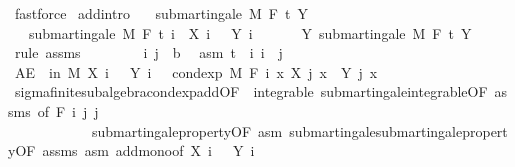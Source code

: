 \begin{isabellebody}
\ fastforce%
\endisatagproof
{\isafoldproof}%
%
\isadelimproof
\isanewline
%
\endisadelimproof
\isanewline
{}\isamarkupfalse%
\ add{\isacharbrackleft}{\kern0pt}intro{\isacharbrackright}{\kern0pt}{\isacharcolon}{\kern0pt}\isanewline
\ \ \ {\isachardoublequoteopen}submartingale\ M\ F\ t\ Y{\isachardoublequoteclose}\isanewline
\ \ \ {\isachardoublequoteopen}submartingale\ M\ F\ t\ {\isacharparenleft}{\kern0pt}{\isasymlambda}i\ {\isasymxi}{\isachardot}{\kern0pt}\ X\ i\ {\isasymxi}\ {\isacharplus}{\kern0pt}\ Y\ i\ {\isasymxi}{\isacharparenright}{\kern0pt}{\isachardoublequoteclose}\isanewline
%
\isadelimproof
%
\endisadelimproof
%
\isatagproof
{}\isamarkupfalse%
\ {\isacharminus}{\kern0pt}\isanewline
\ \ \isamarkupfalse%
\ Y{\isacharcolon}{\kern0pt}\ submartingale\ M\ F\ t\ Y\ \isamarkupfalse%
\ {\isacharparenleft}{\kern0pt}rule\ assms{\isacharparenright}{\kern0pt}\isanewline
\ \ \isacommand{{\isacharbraceleft}{\kern0pt}}\isamarkupfalse%
\isanewline
\ \ \ \ \isamarkupfalse%
\ i\ j\ {\isacharcolon}{\kern0pt}{\isacharcolon}{\kern0pt}\ {\isacharprime}{\kern0pt}b\ \isamarkupfalse%
\ asm{\isacharcolon}{\kern0pt}\ {\isachardoublequoteopen}t\ {\isasymle}\ i{\isachardoublequoteclose}\ {\isachardoublequoteopen}i\ {\isasymle}\ j{\isachardoublequoteclose}\isanewline
\ \ \ \ \isamarkupfalse%
\ {\isachardoublequoteopen}AE\ {\isasymxi}\ in\ M{\isachardot}{\kern0pt}\ X\ i\ {\isasymxi}\ {\isacharplus}{\kern0pt}\ Y\ i\ {\isasymxi}\ {\isasymle}\ cond{\isacharunderscore}{\kern0pt}exp\ M\ {\isacharparenleft}{\kern0pt}F\ i{\isacharparenright}{\kern0pt}\ {\isacharparenleft}{\kern0pt}{\isasymlambda}x{\isachardot}{\kern0pt}\ X\ j\ x\ {\isacharplus}{\kern0pt}\ Y\ j\ x{\isacharparenright}{\kern0pt}\ {\isasymxi}{\isachardoublequoteclose}\ \isanewline
\ \ \ \ \ \ \isamarkupfalse%
\ sigma{\isacharunderscore}{\kern0pt}finite{\isacharunderscore}{\kern0pt}subalgebra{\isachardot}{\kern0pt}cond{\isacharunderscore}{\kern0pt}exp{\isacharunderscore}{\kern0pt}add{\isacharbrackleft}{\kern0pt}OF\ {\isacharunderscore}{\kern0pt}\ integrable\ submartingale{\isachardot}{\kern0pt}integrable{\isacharbrackleft}{\kern0pt}OF\ assms{\isacharbrackright}{\kern0pt}{\isacharcomma}{\kern0pt}\ of\ {\isachardoublequoteopen}F\ i{\isachardoublequoteclose}\ j\ j{\isacharbrackright}{\kern0pt}\ \isanewline
\ \ \ \ \ \ \ \ \ \ \ \ submartingale{\isacharunderscore}{\kern0pt}property{\isacharbrackleft}{\kern0pt}OF\ asm{\isacharbrackright}{\kern0pt}\ submartingale{\isachardot}{\kern0pt}submartingale{\isacharunderscore}{\kern0pt}property{\isacharbrackleft}{\kern0pt}OF\ assms\ asm{\isacharbrackright}{\kern0pt}\ add{\isacharunderscore}{\kern0pt}mono{\isacharbrackleft}{\kern0pt}of\ {\isachardoublequoteopen}X\ i\ {\isacharunderscore}{\kern0pt}{\isachardoublequoteclose}\ {\isacharunderscore}{\kern0pt}\ {\isachardoublequoteopen}Y\ i\ {\isacharunderscore}{\kern0pt}{\isachardoublequoteclose}{\isacharbrackright}{\kern0pt}\ \isamarkupfalse%

\end{isabellebody}
